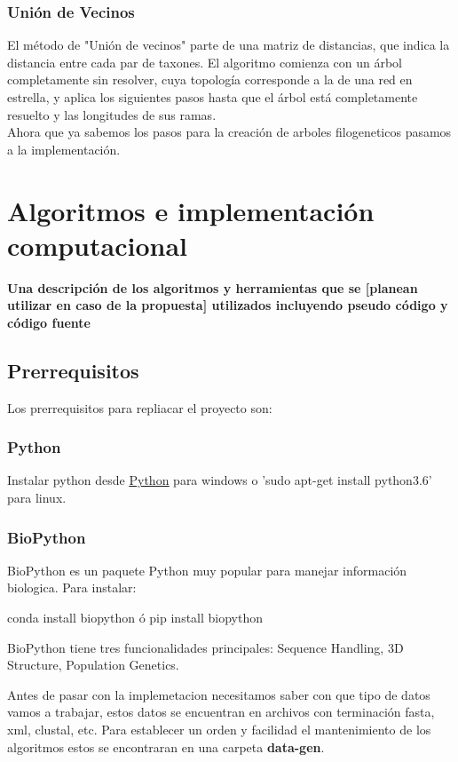 \documentclass[a4paper]{article}
\begin{document}
\subsubsection{Unión de Vecinos}
El método de "Unión de vecinos" parte de una matriz de distancias, que indica la distancia entre cada par de taxones. El algoritmo comienza con un árbol completamente sin resolver, cuya topología corresponde a la de una red en estrella, y aplica los siguientes pasos hasta que el árbol está completamente resuelto y las longitudes de sus ramas.\\

\noindent Ahora que ya sabemos los pasos para la creación de arboles filogeneticos pasamos a la implementación.


\section{Algoritmos e implementación computacional}
\textbf{Una descripción de los algoritmos y herramientas que se [planean utilizar en caso de la propuesta] utilizados incluyendo pseudo código y código fuente}\\
\subsection{Prerrequisitos}

Los prerrequisitos para repliacar el proyecto son:
\subsubsection*{Python}
Instalar python desde \href{https://www.python.org/downloads/}{\underline{Python}} para windows o 'sudo apt-get install python3.6' para linux.
\subsubsection*{BioPython}
BioPython es un paquete Python muy popular para manejar información biologica.
Para instalar:

conda install biopython
ó
pip install biopython

BioPython tiene tres funcionalidades principales:
Sequence Handling, 3D Structure, Population Genetics.


\noindent Antes de pasar con la implemetacion necesitamos saber con que tipo de datos vamos a trabajar, estos datos se encuentran en  archivos con terminación fasta, xml, clustal, etc. Para establecer un orden y facilidad el mantenimiento de los algoritmos estos se encontraran en una carpeta \textbf{data-gen}.
\end{document}
